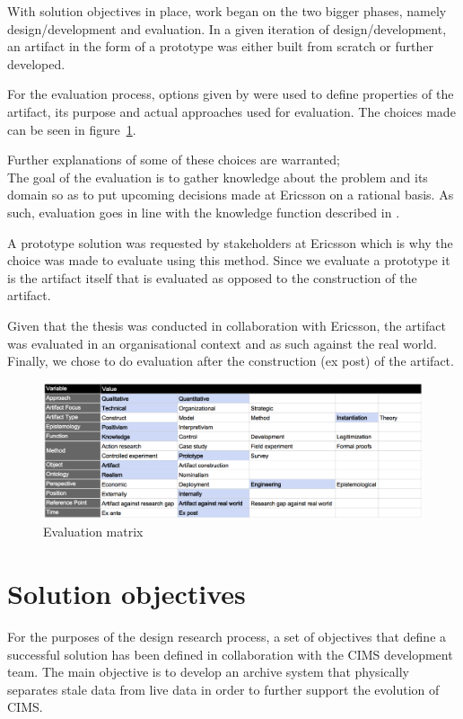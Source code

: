 With solution objectives in place, work began on the two bigger phases, namely design/development and evaluation. In a given iteration of design/development, an artifact in the form of a prototype was either built from scratch or further developed.

For the evaluation process, options given by \cite{DesignEval} were used to define properties of the artifact, its purpose and actual approaches used for evaluation. The choices made can be seen in figure~\ref{fig:matrix}.

Further explanations of some of these choices are warranted;\\
The goal of the evaluation is to gather knowledge about the problem and its domain so as to put upcoming decisions made at Ericsson on a rational basis. As such, evaluation goes in line with the knowledge function described in \cite{DesignEval}.

A prototype solution was requested by stakeholders at Ericsson which is why the choice was made to evaluate using this method. Since we evaluate a prototype it is the artifact itself that is evaluated as opposed to the construction of the artifact.

Given that the thesis was conducted in collaboration with Ericsson, the artifact was evaluated in an organisational context and as such against the real world. Finally, we chose to do evaluation after the construction (ex post) of the artifact.

\begin{figure}[h!]
\centering
\includegraphics[width=0.7\pdfpagewidth]{figure/eval.png}
\caption{Evaluation matrix}
\label{fig:matrix}
\end{figure}


\section{Solution objectives}
For the purposes of the design research process, a set of objectives that define a successful solution has been defined in collaboration with the CIMS development team. The main objective is to develop an archive system that physically separates stale data from live data in order to further support the evolution of CIMS.

